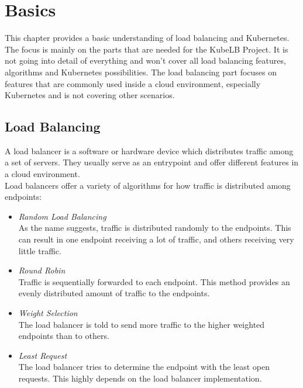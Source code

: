 \chapter{Basics}\label{basics}

This chapter provides a basic understanding of load balancing and Kubernetes.
The focus is mainly on the parts that are needed for the KubeLB Project.
It is not going into detail of everything and won't cover all load balancing features, algorithms and Kubernetes possibilities.
The load balancing part focuses on features that are commonly used inside a cloud environment, especially Kubernetes and is not covering other scenarios.

\section{Load Balancing}

A load balancer is a software or hardware device which distributes traffic among a set of servers.
They usually serve as an entrypoint and offer different features in a cloud environment.
\\
Load balancers offer a variety of algorithms for how traffic is distributed among endpoints:

\begin{itemize}\label{item:lb-algorithms}
    \item \textit{Random Load Balancing} \\
    As the name suggests, traffic is distributed randomly to the endpoints.
    This can result in one endpoint receiving a lot of traffic, and others receiving very little traffic.
    \item \textit{Round Robin} \\
    Traffic is sequentially forwarded to each endpoint.
    This method provides an evenly distributed amount of traffic to the endpoints.
    \item \textit{Weight Selection} \\
    The load balancer is told to send more traffic to the higher weighted endpoints than to others.
    \item \textit{Least Request} \\
    The load balancer tries to determine the endpoint with the least open requests.
    This highly depends on the load balancer implementation.
\end{itemize}

